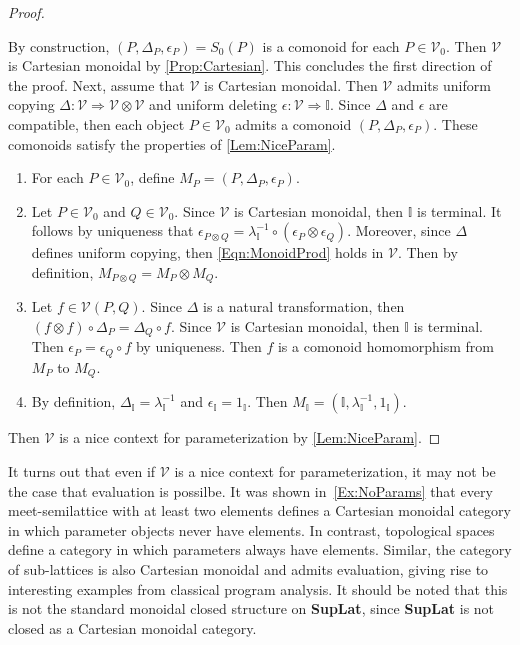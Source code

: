 \begin{proof}
\begin{itemize}
    \end{itemize}
    By construction, $( P, \Delta_P, \epsilon_P ) = S_0( P )$ is a comonoid for each $P \in \mathcal{V}_0$.
    Then $\mathcal{V}$ is Cartesian monoidal by \cref{Prop:Cartesian}.
    This concludes the first direction of the proof.
    Next, assume that $\mathcal{V}$ is Cartesian monoidal.
    Then $\mathcal{V}$ admits uniform copying $\Delta: \mathcal{V} \Rightarrow \mathcal{V} \otimes \mathcal{V}$ and uniform deleting $\epsilon: \mathcal{V} \Rightarrow \mathbb{I}$.
    Since $\Delta$ and $\epsilon$ are compatible, then each object $P \in \mathcal{V}_0$ admits a comonoid $( P, \Delta_P, \epsilon_P )$.
    These comonoids satisfy the properties of \cref{Lem:NiceParam}.
    \begin{enumerate}
    \item For each $P \in \mathcal{V}_0$, define $M_P = ( P, \Delta_P, \epsilon_P )$.
    \item Let $P \in \mathcal{V}_0$ and $Q \in \mathcal{V}_0$.
          Since $\mathcal{V}$ is Cartesian monoidal, then $\mathbb{I}$ is terminal.
          It follows by uniqueness that $\epsilon_{P \otimes Q} = \lambda_{\mathbb{I}}^{-1} \circ ( \epsilon_P \otimes \epsilon_Q )$.
          Moreover, since $\Delta$ defines uniform copying, then \cref{Eqn:MonoidProd} holds in $\mathcal{V}$.
          Then by definition, $M_{P \otimes Q} = M_P \otimes M_Q$.
    \item Let $f \in \mathcal{V}( P, Q )$.
          Since $\Delta$ is a natural transformation, then $( f \otimes f ) \circ \Delta_P = \Delta_Q \circ f$.
          Since $\mathcal{V}$ is Cartesian monoidal, then $\mathbb{I}$ is terminal.
          Then $\epsilon_P = \epsilon_Q \circ f$ by uniqueness.
          Then $f$ is a comonoid homomorphism from $M_P$ to $M_Q$.
    \item By definition, $\Delta_{\mathbb{I}} = \lambda_{\mathbb{I}}^{-1}$ and $\epsilon_{\mathbb{I}} = 1_\mathbb{I}$.
          Then $M_{\mathbb{I}} = ( \mathbb{I}, \lambda_{\mathbb{I}}^{-1}, 1_{\mathbb{I}} )$.
    \end{enumerate}
    Then $\mathcal{V}$ is a nice context for parameterization by \cref{Lem:NiceParam}.
\end{proof}

It turns out that even if $\mathcal{V}$ is a nice context for parameterization, it may not be the case that evaluation is possilbe.
It was shown in~\cref{Ex:NoParams} that every meet-semilattice with at least two elements defines a Cartesian monoidal category in which parameter objects never have elements.
In contrast, topological spaces define a category in which parameters always have elements.
Similar, the category of sub-lattices is also Cartesian monoidal and admits evaluation, giving rise to interesting examples from classical program analysis.
It should be noted that this is not the standard monoidal closed structure on \textbf{SupLat}, since \textbf{SupLat} is not closed as a Cartesian monoidal category.

